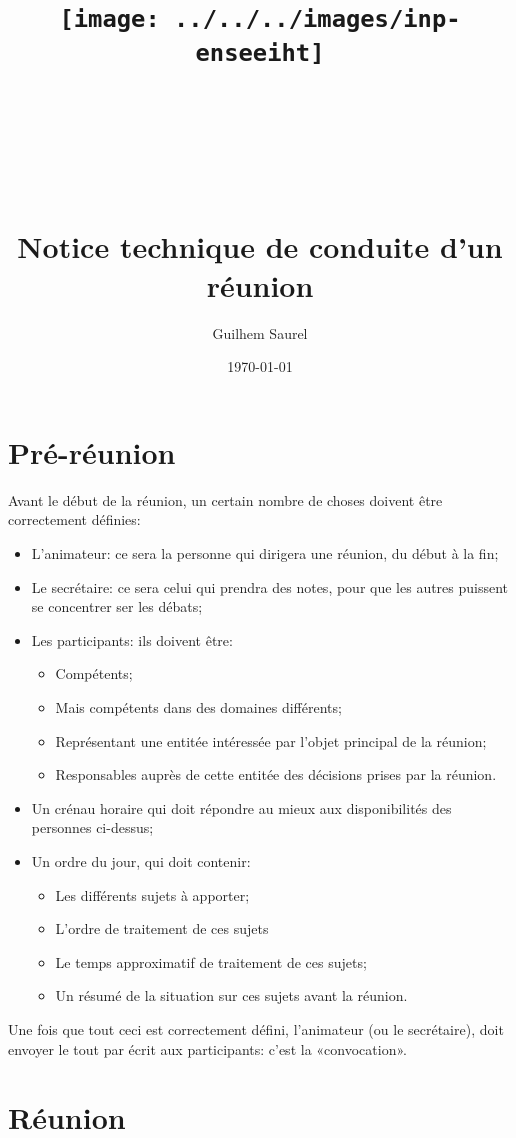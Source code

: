 \documentclass[12pt]{article}
\title{\texttt{[image: ../../../images/inp-enseeiht]} \\ ~ \\ ~ \\ ~ \\ ~ \\
Notice technique de conduite d’un réunion}
\author{Guilhem Saurel}
\date{\today}
\begin{document}
\maketitle

\section{Pré-réunion}
Avant le début de la réunion, un certain nombre de choses doivent être correctement définies:
\begin{itemize}
    \item L’animateur: ce sera la personne qui dirigera une réunion, du début à la fin;
    \item Le secrétaire: ce sera celui qui prendra des notes, pour que les autres puissent se concentrer ser les débats;
    \item Les participants: ils doivent être:
    \begin{itemize}
        \item Compétents;
        \item Mais compétents dans des domaines différents;
        \item Représentant une entitée intéressée par l’objet principal de la réunion;
        \item Responsables auprès de cette entitée des décisions prises par la réunion.
    \end{itemize}
    \item Un crénau horaire qui doit répondre au mieux aux disponibilités des personnes ci-dessus;
    \item Un ordre du jour, qui doit contenir:
    \begin{itemize}
        \item Les différents sujets à apporter;
        \item L’ordre de traitement de ces sujets 
        \item Le temps approximatif de traitement de ces sujets;
        \item Un résumé de la situation sur ces sujets avant la réunion.
    \end{itemize}
\end{itemize}

Une fois que tout ceci est correctement défini, l’animateur (ou le secrétaire), doit envoyer le tout par écrit aux participants: c’est la «convocation».
    
\section{Réunion}
\end{document}
